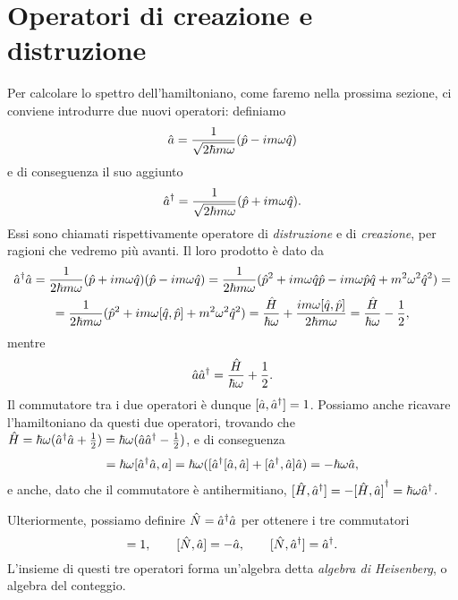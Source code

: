 \section{Operatori di creazione e distruzione}
Per calcolare lo spettro dell'hamiltoniano, come faremo nella prossima sezione, ci conviene introdurre due nuovi operatori: definiamo
\begin{equation}
	\hat{a}=\frac1{\sqrt{2\hbar m\omega}}(\hat{p}-im\omega\hat{q})
	\label{eq:operatore-distruzione}
\end{equation}
e di conseguenza il suo aggiunto
\begin{equation}
	{\hat{a}}^\dagger=\frac1{\sqrt{2\hbar m\omega}}(\hat{p}+im\omega\hat{q}).
	\label{eq:operatore-creazione}
\end{equation}
Essi sono chiamati rispettivamente operatore di \emph{distruzione} e di \emph{creazione}, per ragioni che vedremo più avanti.
Il loro prodotto è dato da
\begin{multline}
	{\hat{a}}^\dagger\hat{a}=\frac1{2\hbar m\omega}(\hat{p}+im\omega\hat{q})(\hat{p}-im\omega\hat{q})=\frac1{2\hbar m\omega}(\hat{p}^2+im\omega\hat{q}\hat{p}-im\omega\hat{p}\hat{q}+m^2\omega^2\hat{q}^2)=\\=\frac1{2\hbar m\omega}(\hat{p}^2+im\omega[\hat{q},\hat{p}]+m^2\omega^2\hat{q}^2)=\frac{\hat{H}}{\hbar\omega}+\frac{im\omega[\hat{q},\hat{p}]}{2\hbar m\omega}=\frac{\hat{H}}{\hbar\omega}-\frac12,
\end{multline}
mentre
\begin{equation}
	\hat{a}{\hat{a}}^\dagger=\frac{\hat{H}}{\hbar\omega}+\frac12.
\end{equation}
Il commutatore tra i due operatori è dunque $[\hat{a},{\hat{a}}^\dagger]=1$.
Possiamo anche ricavare l'hamiltoniano da questi due operatori, trovando che $\hat{H}=\hbar\omega({\hat{a}}^\dagger\hat{a}+\frac12)=\hbar\omega(\hat{a}{\hat{a}}^\dagger-\frac12)$, e di conseguenza
\begin{equation}
	[\op H,\op a]=\hbar\omega[\adj{\op a}\op a, a]=\hbar\omega([\adj{\op a}[\op a,\op a]+[\adj{\op a},\op a]\op a)=-\hbar\omega\op a,
\end{equation}
e anche, dato che il commutatore è antihermitiano, $[\hat{H},{\hat{a}}^\dagger]=-{[\hat{H},\hat{a}]}^\dagger=\hbar\omega{\hat{a}}^\dagger$.

Ulteriormente, possiamo definire $\hat{N}={\hat{a}}^\dagger\hat{a}$ per ottenere i tre commutatori
\begin{equation}
	[\op a,\adj{\op a}]=1,\qquad [\op N,\op a]=-\op a,\qquad [\op N,\adj{\op a}]=\adj{\op a}.
	\label{eq:algebra-heisenberg}
\end{equation}
L'insieme di questi tre operatori forma un'algebra detta \emph{algebra di Heisenberg}, o algebra del conteggio.

